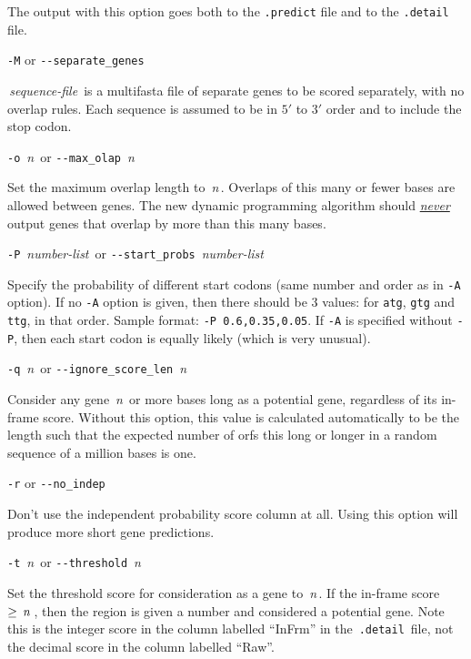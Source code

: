 \documentclass[fleqn,titlepage,11pt]{article}
\def\Desc#1{\,\mbox{\emph{#1}}\,}
\def\Pg#1{\texttt{#1}}
\begin{document}
  The output with this option goes both to the \Pg{.predict} file
  and to the \Pg{.detail} file.

\exdent
  \verb`-M` \enskip or \enskip \verb`--separate_genes`

  \Desc{sequence-file} is a multifasta file of separate genes to
  be scored separately, with no overlap rules.  Each sequence
  is assumed to be in $5'$ to $3'$ order and to include the stop
  codon.

\exdent
  \verb`-o` \Desc{n} \enskip or \enskip \verb`--max_olap` \Desc{n}

  Set the maximum overlap length to \Desc{n}.  Overlaps of this
  many or fewer bases are allowed between genes.  The new
  dynamic programming algorithm should \underline{\emph{never}}
  output genes that overlap by more than this many bases.

\exdent
  \verb`-P` \Desc{number-list} \enskip or \enskip \verb`--start_probs` \Desc{number-list}

  Specify the probability of different start codons (same number and order
  as in \Pg{-A} option).  If no \Pg{-A} option is given, then there should be 3
  values:  for \Pg{atg}, \Pg{gtg} and \Pg{ttg},
  in that order.  Sample format:  \verb`-P 0.6,0.35,0.05`.
  If \Pg{-A} is specified without \Pg{-P}, then each start codon is equally likely
  (which is very unusual).

\exdent
  \verb`-q` \Desc{n} \enskip or \enskip \verb`--ignore_score_len` \Desc{n}

  Consider any gene \Desc{n} or more bases long as a potential
  gene, regardless of its in-frame score.
  Without this option, this value is calculated automatically to
  be the length such that the expected number of orfs this long
  or longer in a random sequence of a million bases is one.

\exdent
  \verb`-r` \enskip or \enskip \verb`--no_indep`

  Don't use the independent probability score column at all.  Using
  this option will produce more short gene predictions.

\exdent
  \verb`-t` \Desc{n} \enskip or \enskip \verb`--threshold` \Desc{n}

  Set the threshold score for consideration as a gene to \Desc{n}.
  If the in-frame
  score $\ge \Desc{n}$, then the region is given a number and considered
  a potential gene.  Note this is the integer score in the column labelled
  ``InFrm'' in the \,\verb`.detail`\, file, not the decimal score in
  the column labelled ``Raw''.
\end{document}
